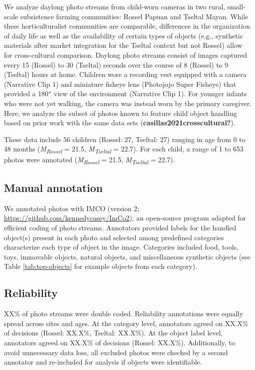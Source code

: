 \documentclass[10pt, letterpaper]{article}
\begin{document}
We analyze daylong photo streams from child-worn cameras in two rural,
small-scale subsistence farming communities: Rossel Papuan and Tseltal
Mayan. While these horticulturalist communities are comparable,
differences in the organization of daily life as well as the
availability of certain types of objects (e.g., synthetic materials
after market integration for the Tseltal context but not Rossel) allow
for cross-cultural comparison. Daylong photo streams consist of images
captured every 15 (Rossel) to 30 (Tseltal) seconds over the course of 8
(Rossel) to 9 (Tseltal) hours at home. Children wore a recording vest
equipped with a camera (Narrative Clip 1) and miniature fisheye lens
(Photojojo Super Fisheye) that provided a 180\(\text{\textdegree}\) view
of the environment (Narrative Clip 1). For younger infants who were not
yet walking, the camera was instead worn by the primary caregiver. Here,
we analyze the subset of photos known to feature child object handling
based on prior work with the same data sets
(\textbf{casillas2021crosscultural?}).

These data include 56 children (Rossel: 27, Tseltal: 27) ranging in age
from 0 to 48 months (\emph{M}\textsubscript{\emph{Rossel}} = 21.5,
\emph{M}\textsubscript{\emph{Tseltal}} = 22.7). For each child, a range
of 1 to 653 photos were annotated (\emph{M}\textsubscript{\emph{Rossel}}
= 21.5, \emph{M}\textsubscript{\emph{Tseltal}} = 22.7).

\hypertarget{manual-annotation}{%
\subsection{Manual annotation}\label{manual-annotation}}

We annotated photos with IMCO (version 2;
\url{https://github.com/kennedycasey/ImCo2}), an open-source program
adapted for efficient coding of photo streams. Annotators provided
labels for the handled object(s) present in each photo and selected
among predefined categories characterize each type of object in the
image. Categories included food, tools, toys, immovable objects, natural
objects, and miscellaneous synthetic objects (see Table
\ref{tab:top-objects} for example objects from each category).

\hypertarget{reliability}{%
\subsection{Reliability}\label{reliability}}

XX\% of photo streams were double coded. Reliability annotations were
equally spread across sites and ages. At the category level, annotators
agreed on XX.X\% of decisions (Rossel: XX.X\%, Tseltal: XX.X\%). At the
object label level, annotators agreed on XX.X\% of decisions (Rossel:
XX.X\%). Additionally, to avoid unnecessary data loss, all excluded
photos were checked by a second annotator and re-included for analysis
if objects were identifiable.
\end{document}
